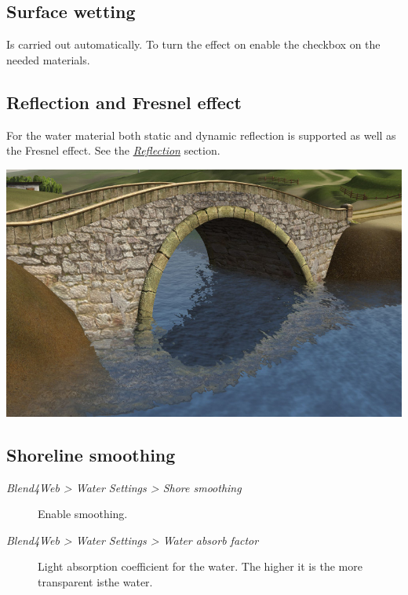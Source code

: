 \documentclass[a4paper,12pt,oneside]{sphinxmanual}
\begin{document}
\subsection{Surface wetting}
\label{outdoor_rendering:id6}
Is carried out automatically. To turn the effect on enable the  checkbox on the needed materials.


\subsection{Reflection and Fresnel effect}
\label{outdoor_rendering:id7}
For the water material both static and dynamic reflection is supported as well as the Fresnel effect. See the {\hyperref[materials:material-mirror]{\emph{Reflection}}} section.

{\hfill\includegraphics[width=1.000\linewidth]{water_reflection_dynamic.jpg}\hfill}


\subsection{Shoreline smoothing}
\label{outdoor_rendering:id8}\begin{description}
\item[{\emph{Blend4Web \textgreater{} Water Settings \textgreater{} Shore smoothing}}] \leavevmode
Enable smoothing.

\item[{\emph{Blend4Web \textgreater{} Water Settings \textgreater{} Water absorb factor}}] \leavevmode
Light absorption coefficient for the water. The higher it is the more transparent isthe water.

\end{description}
\end{document}
